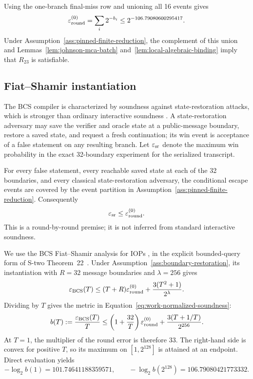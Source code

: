 Using the one-branch final-miss row and unioning all 16 events gives
\begin{equation}
 \varepsilon_{\rm round}^{(0)}
   =\sum_i 2^{-b_i}
   \le 2^{-106.79080600295417}.
 \label{eq:coarse-interactive-error}
\end{equation}
Under Assumption~\ref{ass:pinned-finite-reduction}, the complement of this
union and Lemmas~\ref{lem:johnson-mca-batch}
and~\ref{lem:local-algebraic-binding} imply that \(R_{23}\) is satisfiable.

\subsection{Fiat--Shamir instantiation}

The BCS compiler is characterized by soundness against state-restoration
attacks, which is stronger than ordinary interactive soundness
\cite{BenSassonChiesaSpooner2016,BlockGarretaKatzThalerTiwariZajac2023}.
A state-restoration adversary may save the verifier and oracle state at a
public-message boundary, restore a saved state, and request a fresh
continuation; its win event is acceptance of a false statement on any
resulting branch.  Let \(\varepsilon_{\rm sr}\) denote the maximum win
probability in the exact 32-boundary experiment for the serialized
transcript.

\begin{assumption}
\label{ass:boundary-restoration}
For every false statement, every reachable saved state at each of the 32
boundaries, and every classical state-restoration adversary, the conditional
escape events are covered by the event partition in
Assumption~\ref{ass:pinned-finite-reduction}.  Consequently
\[
 \varepsilon_{\rm sr}\le\varepsilon_{\rm round}^{(0)}.
\]
This is a round-by-round premise; it is not inferred from standard
interactive soundness.
\end{assumption}

We use the BCS Fiat--Shamir analysis for IOPs
\cite{BenSassonChiesaSpooner2016}, in the explicit bounded-query form of
S-two Theorem~22~\cite{CarmonEtAl2026Stwo}.  Under
Assumption~\ref{ass:boundary-restoration}, its instantiation with \(R=32\)
message boundaries and \(\lambda=256\) gives
\begin{equation}
 \varepsilon_{\mathrm{BCS}}(T)
 \le (T+R)\varepsilon_{\rm round}^{(0)}
       +\frac{3(T^2+1)}{2^\lambda}.
 \label{eq:bcs-raw}
\end{equation}
Dividing by \(T\) gives the metric in
Equation~\eqref{eq:work-normalized-soundness}:
\begin{equation}
 b(T):=\frac{\varepsilon_{\mathrm{BCS}}(T)}{T}
 \le
 \left(1+\frac{32}{T}\right)\varepsilon_{\rm round}^{(0)}
 +\frac{3(T+1/T)}{2^{256}}.
 \label{eq:bcs-normalized}
\end{equation}
At \(T=1\), the multiplier of the round error is therefore 33.  The
right-hand side is convex for positive \(T\), so its maximum on
\([1,2^{128}]\) is attained at an endpoint.  Direct evaluation yields
\[
 -\log_2 b(1)=101.74641188359571,
 \qquad
 -\log_2 b(2^{128})=106.79080421773332.
\]

